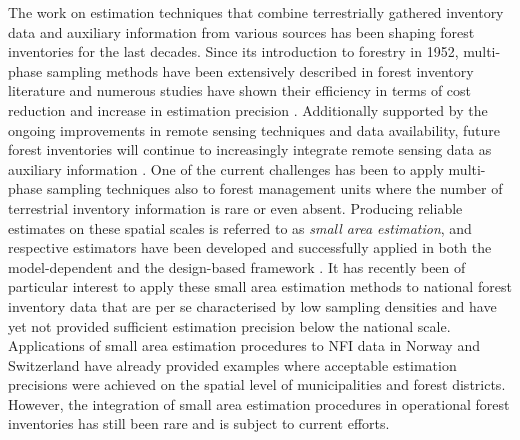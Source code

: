 The work on estimation techniques that combine terrestrially gathered inventory data and auxiliary information from various sources has been shaping forest inventories for the last decades. Since its introduction to forestry in 1952, multi-phase sampling methods have been extensively described in forest inventory literature \citep[e.g.,][]{gregoire2007, kohl2006, kangas2006, schreuder1993, mandallaz2008, saborowski2010, vonLuepke2012, mandallaz2013c} and numerous studies have shown their efficiency in terms of cost reduction and increase in estimation precision \citep[e.g.,][]{ bockmann1998, vonluepke2013, mandallaz2013b, massey2015_thesis}. Additionally supported by the ongoing improvements in remote sensing techniques and data availability, future forest inventories will continue to increasingly integrate remote sensing data as auxiliary information \citep{kangas2018}. One of the current challenges has been to apply multi-phase sampling techniques also to forest management units where the number of terrestrial inventory information is rare or even absent. Producing reliable estimates on these spatial scales is referred to as \textit{small area estimation}, and respective estimators have been developed and successfully applied in both the model-dependent \citep{naesset1997b, breidenbach2016} and the design-based framework \citep{mandallaz2013a, mandallaz2013b, mandallaz2013c}. It has recently been of particular interest to apply these small area estimation methods to national forest inventory data that are per se characterised by low sampling densities and have yet not provided sufficient estimation precision below the national scale. Applications of small area estimation procedures to NFI data in Norway \citep{breidenbach2012} and Switzerland \citep{magnussen2014a} have already provided examples where acceptable estimation precisions were achieved on the spatial level of municipalities and forest districts. However, the integration of small area estimation procedures in operational forest inventories has still been rare and is subject to current efforts.

%
%






